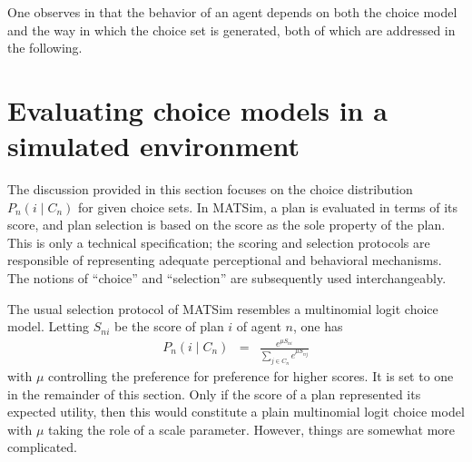 One observes in  that the
behavior of an agent depends on both the choice model and the way
in which the choice set is generated, both of which are addressed
in the following.

\section{\label{sec:Evaluating-choice-models}Evaluating choice models in
a simulated environment}

The discussion provided in this section focuses on the choice distribution
$P_{n}(i\mid C_{n})$ for given choice sets. In MATSim, a plan is
evaluated in terms of its score, and plan selection is based on the
score as the sole property of the plan. This is only a technical specification;
the scoring and selection protocols are responsible of representing
adequate perceptional and behavioral mechanisms. The notions of {}``choice''
and {}``selection'' are subsequently used interchangeably. 

The usual selection protocol of MATSim resembles a multinomial logit
choice model. Letting $S_{ni}$ be the score of plan $i$ of agent
$n$, one has
\begin{eqnarray}
P_{n}(i\mid C_{n}) & = & \frac{e^{\mu S_{ni}}}{\sum_{j\in C_{n}}e^{\mu S_{nj}}}\label{eq:ExpBetaPlanSelector}
\end{eqnarray}
with $\mu$ controlling the preference for preference for higher scores.
It is set to one in the remainder of this section. Only if the score
of a plan represented its expected utility, then this would constitute
a plain multinomial logit choice model with $\mu$ taking the role
of a scale parameter. However, things are somewhat more complicated.

